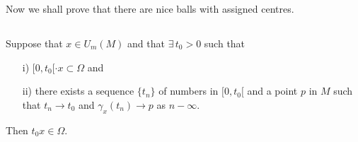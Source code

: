Now we shall prove that there are nice balls with assigned centres.

\subsection{}\label{chap7:7.3.2}

\begin{lemma*}
Suppose that $x\in U_{m}(M)$ and that $\exists\, t_{0}>0$ such that
\begin{itemize}
\item[\rm i)] $[0,t_{0}[\cdot x\subset \Omega$ and

\item[\rm ii)] there exists a sequence $\{t_{n}\}$ of numbers in
  $[0,t_{0}[$ and a point $p$ in $M$ such that $t_{n}\to t_{0}$ and
    $\gamma_{x}(t_{n})\to p$ as $n-\infty$.
\end{itemize}
Then $t_{0}x\in \Omega$.
\end{lemma*}

